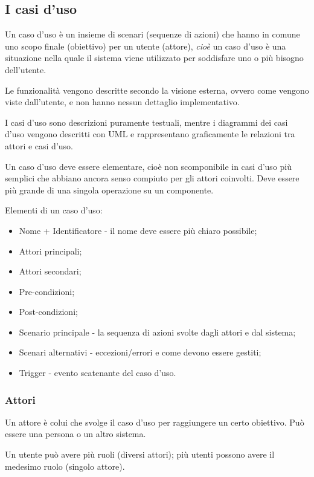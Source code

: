 \subsection{I casi d'uso}
Un caso d'uso è un insieme di scenari (sequenze di azioni) che hanno in comune uno scopo finale (obiettivo) per un utente (attore),
\textit{cioè} un caso d'uso è una situazione nella quale il sistema viene utilizzato per soddisfare uno o più bisogno dell'utente.

Le funzionalità vengono descritte secondo la visione esterna, ovvero come vengono viste dall'utente, e non hanno nessun dettaglio implementativo.

I casi d'uso sono descrizioni puramente testuali, mentre i diagrammi dei casi d'uso vengono descritti con UML e rappresentano graficamente le relazioni tra attori e casi d'uso.

Un caso d'uso deve essere elementare, cioè non scomponibile in casi d'uso più semplici che abbiano ancora senso compiuto per gli attori coinvolti. 
Deve essere più grande di una singola operazione su un componente. 

Elementi di un caso d'uso:
\begin{itemize}
\item Nome + Identificatore - il nome deve essere più chiaro possibile;
\item Attori principali;
\item Attori secondari;
\item Pre-condizioni;
\item Post-condizioni; 
\item Scenario principale - la sequenza di azioni svolte dagli attori e dal sistema;
\item Scenari alternativi - eccezioni/errori e come devono essere gestiti;
\item Trigger - evento scatenante del caso d'uso.
\end{itemize}

\subsubsection{Attori}

Un attore è colui che svolge il caso d'uso per raggiungere un certo obiettivo. Può essere una persona o un altro sistema. 

Un utente può avere più ruoli (diversi attori); più utenti possono avere il medesimo ruolo (singolo attore). 

